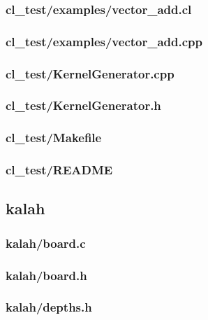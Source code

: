 \documentclass{article}
\begin{document}
\subsubsection*{cl\_test/examples/vector\_add.cl}


\subsubsection*{cl\_test/examples/vector\_add.cpp}


\subsubsection*{cl\_test/KernelGenerator.cpp}


\subsubsection*{cl\_test/KernelGenerator.h}


\subsubsection*{cl\_test/Makefile}


\subsubsection*{cl\_test/README}


\subsection*{kalah}
\subsubsection*{kalah/board.c}


\subsubsection*{kalah/board.h}


\subsubsection*{kalah/depths.h}

\end{document}

